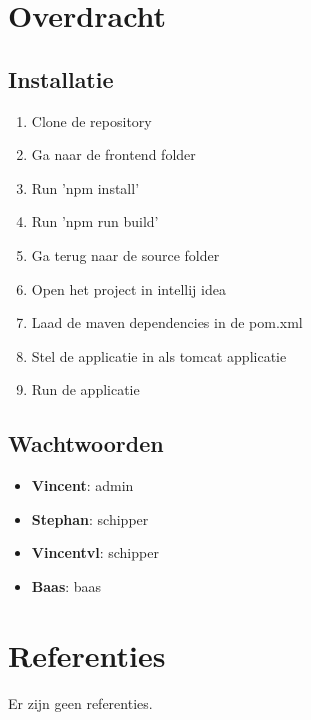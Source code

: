 \documentclass{article}
\begin{document}
\section{Overdracht} 
\subsection{Installatie}
\begin{enumerate}
    \item Clone de repository  
    \item Ga naar de frontend folder 
    \item Run 'npm install'
    \item Run 'npm run build'
    \item Ga terug naar de source folder 
    \item Open het project in intellij idea 
    \item Laad de maven dependencies in de pom.xml 
    \item Stel de applicatie in als tomcat applicatie
    \item Run de applicatie
\end{enumerate}
\subsection{Wachtwoorden}
\begin{itemize}
    \item \textbf{Vincent}: admin 
    \item \textbf{Stephan}: schipper 
    \item \textbf{Vincentvl}: schipper 
    \item \textbf{Baas}: baas
\end{itemize}


\section{Referenties}
Er zijn geen referenties.
\end{document}
